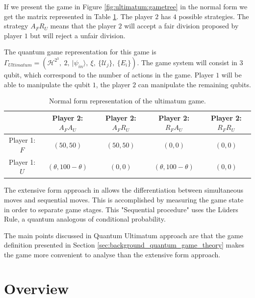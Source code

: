 If we present the game in Figure \ref{fig:ultimatum:gametree} in the normal form we get the matrix represented in Table \ref{tab:tabelaultimatumestoufofida}. The player $2$ has $4$ possible strategies. The strategy $A_{F}R_{U}$ means that the player $2$ will accept a fair division proposed by player $1$ but will reject a unfair division.

 The quantum game representation for this game is $
\Gamma_{Ultimatum}=(\mathcal{H}^{2^{3}},\: 2,\:\vert\psi_{in}\rangle,\:\xi,\:\{\mathcal{U}_{j}\},\:\{E_{i}\})
$. The game system will consist in $3$ qubit, which correspond to the number of actions in the game. Player $1$ will be able to manipulate the qubit $1$, the player $2$ can manipulate the remaining qubits. 


\begin{center}
\begin{table}[h]
\begin{centering}
\begin{tabular}{ccccc}
\hline 
 & Player 2: $A_{F}A_{U}$ & Player 2: $A_{F}R_{U}$ & Player 2: $R_{F}A_{U}$ & Player 2: $R_{F}R_{U}$\tabularnewline
\hline 
Player 1: $F$ & $(50,50)$ & $(50,50)$& $(0,0)$ & $(0,0)$\tabularnewline
Player 1: $U$ & $(\theta,100-\theta)$ & $(0,0)$& $(\theta,100-\theta)$ & $(0,0)$\tabularnewline
\hline 
\end{tabular}
\par\end{centering}

\caption{Normal form representation of the ultimatum game.}
\label{tab:tabelaultimatumestoufofida}
\end{table}
\par\end{center}

The extensive form approach in \cite{Fra2011} allows the differentiation between simultaneous moves and sequential moves. This is accomplished by measuring the game state in order to separate game stages. This "Sequential procedure" uses the L\"{u}ders Rule, a quantum analogous of conditional probability.


The main points discussed in  \cite{Fra2011} Quantum Ultimatum approach are that the game definition presented in Section \ref{sec:background_quantum_game_theory}  makes the game more convenient to analyse than the extensive form approach.






\clearpage
\section{Overview}
\label{sec:related_work_overview}


